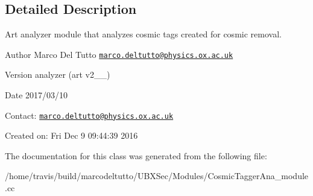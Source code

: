 \subsection{Detailed Description}
Art analyzer module that analyzes cosmic tags created for cosmic removal. 

\begin{DoxyAuthor}{Author}
Marco Del Tutto \href{mailto:marco.deltutto@physics.ox.ac.uk}{\tt marco.\-deltutto@physics.\-ox.\-ac.\-uk}
\end{DoxyAuthor}
\begin{DoxyVersion}{Version}
analyzer (art v2\-\_\-\_)
\end{DoxyVersion}
\begin{DoxyDate}{Date}
2017/03/10
\end{DoxyDate}
Contact\-: \href{mailto:marco.deltutto@physics.ox.ac.uk}{\tt marco.\-deltutto@physics.\-ox.\-ac.\-uk}

Created on\-: Fri Dec 9 09\-:44\-:39 2016 

The documentation for this class was generated from the following file\-:\begin{DoxyCompactItemize}
\item 
/home/travis/build/marcodeltutto/\-U\-B\-X\-Sec/\-Modules/Cosmic\-Tagger\-Ana\-\_\-module.\-cc\end{DoxyCompactItemize}
